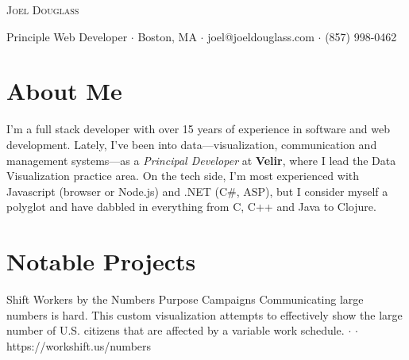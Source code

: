 \documentclass{article}
\begin{document}
\pagestyle{fancy}	

\vspace{-8pt}
\begin{center}
  \Huge \textsc{Joel Douglass} 
\end{center}

\begin{center}
  \small 
  Principle Web Developer $\cdot$ Boston, MA $\cdot$ joel@joeldouglass.com $\cdot$ (857) 998-0462
\end{center}

\vspace{6pt}

\normalsize

\vspace{-6pt}
\section{About Me}
I'm a full stack developer with over 15 years of experience in software and web development.
Lately, I've been into data---visualization, communication and management systems---as a \textit{Principal Developer} at \textbf{Velir}, where I lead the Data Visualization practice area.
On the tech side, I'm most experienced with Javascript (browser or Node.js) and .NET (C\#, ASP), but I consider myself a polyglot and have dabbled in everything from C, C++ and Java to Clojure.

\section{Notable Projects}

{Shift Workers by the Numbers}
{Purpose Campaigns}
{
  Communicating large numbers is hard. This custom visualization attempts to effectively show the large number of U.S. citizens that are affected by a variable work schedule.
  $\cdot$ 
  $\cdot$ \\ https://workshift.us/numbers
}
\end{document}
